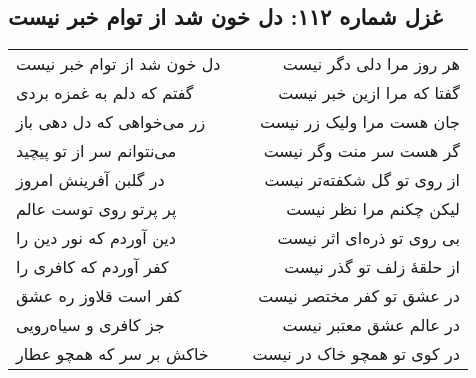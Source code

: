 \begin{center}
\section*{غزل شماره ۱۱۲: دل خون شد از توام خبر نیست}
\label{sec:112}
\begin{longtable}{l p{0.5cm} r}
دل خون شد از توام خبر نیست
&&
هر روز مرا دلی دگر نیست
\\
گفتم که دلم به غمزه بردی
&&
گفتا که مرا ازین خبر نیست
\\
زر می‌خواهی که دل دهی باز
&&
جان هست مرا ولیک زر نیست
\\
می‌نتوانم سر از تو پیچید
&&
گر هست سر منت وگر نیست
\\
در گلبن آفرینش امروز
&&
از روی تو گل شکفته‌تر نیست
\\
پر پرتو روی توست عالم
&&
لیکن چکنم مرا نظر نیست
\\
دین آوردم که نور دین را
&&
بی روی تو ذره‌ای اثر نیست
\\
کفر آوردم که کافری را
&&
از حلقهٔ زلف تو گذر نیست
\\
کفر است قلاوز ره عشق
&&
در عشق تو کفر مختصر نیست
\\
جز کافری و سیاه‌رویی
&&
در عالم عشق معتبر نیست
\\
خاکش بر سر که همچو عطار
&&
در کوی تو همچو خاک در نیست
\\
\end{longtable}
\end{center}
